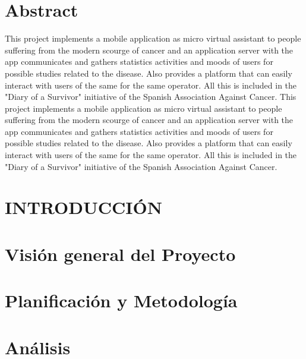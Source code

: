 \documentclass[b5paper,10pt,twoside]{book}
\begin{document}
	\chapter*{Abstract}
	 	This project implements a mobile application as micro virtual assistant to people suffering from the modern scourge of cancer and an application server with the app communicates and gathers statistics activities and moods of users for possible studies related to the disease. Also provides a platform that can easily interact with users of the same for the same operator. All this is included in the "Diary of a Survivor" initiative of the Spanish Association Against Cancer. This project implements a mobile application as micro virtual assistant to people suffering from the modern scourge of cancer and an application server with the app communicates and gathers statistics activities and moods of users for possible studies related to the disease. Also provides a platform that can easily interact with users of the same for the same operator. All this is included in the "Diary of a Survivor" initiative of the Spanish Association Against Cancer.\cite{SHAREESP}
	
	\tableofcontents
	
	\listoffigures
	
	\listoftables
	

	\chapter{INTRODUCCIÓN}
	
	
	
	\chapter{Visión general del Proyecto}

	
	
	\chapter{Planificación y Metodología}
	
	
	
	\chapter{Análisis}
	
	
	
\end{document}
